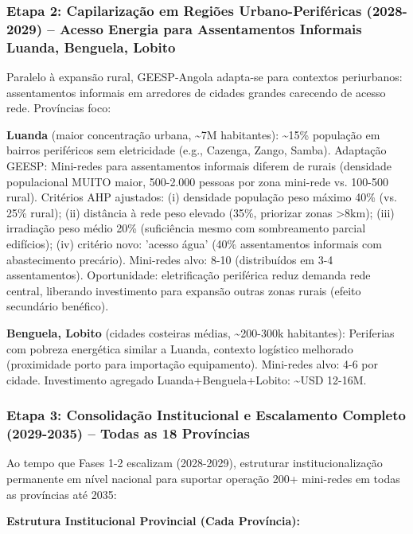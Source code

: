 \documentclass[12pt, a4paper]{article}
\begin{document}
\subsubsection{Etapa 2: Capilarização em Regiões Urbano-Periféricas (2028-2029) -- Acesso Energia para Assentamentos Informais Luanda, Benguela, Lobito}

Paralelo à expansão rural, GEESP-Angola adapta-se para contextos periurbanos: assentamentos informais em arredores de cidades grandes carecendo de acesso rede. Províncias foco:

\textbf{Luanda} (maior concentração urbana, \textasciitilde{}7M habitantes): \textasciitilde{}15\% população em bairros periféricos sem eletricidade (e.g., Cazenga, Zango, Samba). Adaptação GEESP: Mini-redes para assentamentos informais diferem de rurais (densidade populacional MUITO maior, 500-2.000 pessoas por zona mini-rede vs. 100-500 rural). Critérios AHP ajustados: (i) densidade população peso máximo 40\% (vs. 25\% rural); (ii) distância à rede peso elevado (35\%, priorizar zonas >8km); (iii) irradiação peso médio 20\% (suficiência mesmo com sombreamento parcial edifícios); (iv) critério novo: 'acesso água' (40\% assentamentos informais com abastecimento precário). Mini-redes alvo: 8-10 (distribuídos em 3-4 assentamentos). Oportunidade: eletrificação periférica reduz demanda rede central, liberando investimento para expansão outras zonas rurais (efeito secundário benéfico).

\textbf{Benguela, Lobito} (cidades costeiras médias, \textasciitilde{}200-300k habitantes): Periferias com pobreza energética similar a Luanda, contexto logístico melhorado (proximidade porto para importação equipamento). Mini-redes alvo: 4-6 por cidade. Investimento agregado Luanda+Benguela+Lobito: \textasciitilde{}USD 12-16M.

\subsubsection{Etapa 3: Consolidação Institucional e Escalamento Completo (2029-2035) -- Todas as 18 Províncias}

Ao tempo que Fases 1-2 escalizam (2028-2029), estruturar institucionalização permanente em nível nacional para suportar operação 200+ mini-redes em todas as províncias até 2035:

\textbf{Estrutura Institucional Provincial (Cada Província):}
\end{document}
